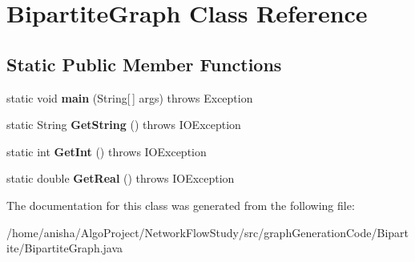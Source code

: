 \hypertarget{classBipartiteGraph}{}\section{Bipartite\+Graph Class Reference}
\label{classBipartiteGraph}
\subsection*{Static Public Member Functions}
\begin{DoxyCompactItemize}
\item 
static void {\bfseries main} (String\mbox{[}$\,$\mbox{]} args)  throws Exception 	\hypertarget{classBipartiteGraph_a83c42625e4bc0052172bdf15df4b8f0d}{}\label{classBipartiteGraph_a83c42625e4bc0052172bdf15df4b8f0d}

\item 
static String {\bfseries Get\+String} ()  throws I\+O\+Exception  	\hypertarget{classBipartiteGraph_a06d4a7fdf2314c5c739ac1d3e2f828aa}{}\label{classBipartiteGraph_a06d4a7fdf2314c5c739ac1d3e2f828aa}

\item 
static int {\bfseries Get\+Int} ()  throws I\+O\+Exception  	\hypertarget{classBipartiteGraph_aaf66b7d13f37823872a8fc45cb380790}{}\label{classBipartiteGraph_aaf66b7d13f37823872a8fc45cb380790}

\item 
static double {\bfseries Get\+Real} ()  throws I\+O\+Exception  	\hypertarget{classBipartiteGraph_ab955d42bb5e27eecd6e168705526927f}{}\label{classBipartiteGraph_ab955d42bb5e27eecd6e168705526927f}

\end{DoxyCompactItemize}


The documentation for this class was generated from the following file\+:\begin{DoxyCompactItemize}
\item 
/home/anisha/\+Algo\+Project/\+Network\+Flow\+Study/src/graph\+Generation\+Code/\+Bipartite/Bipartite\+Graph.\+java\end{DoxyCompactItemize}
